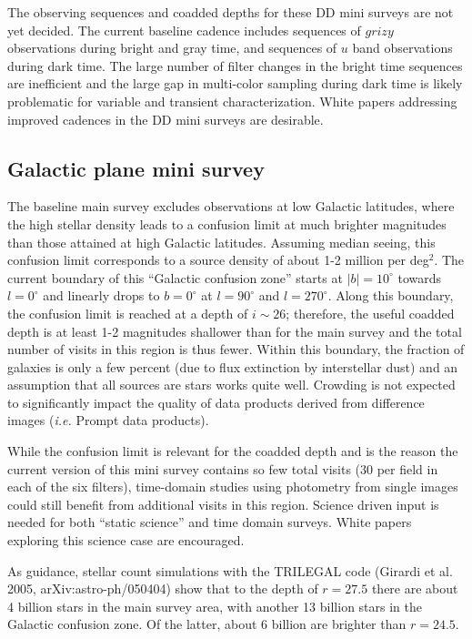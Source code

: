 \documentclass[DM,toc,usenatbib]{lsstdoc}
\begin{document}
The observing sequences and coadded depths for these DD mini surveys are not yet decided. The current baseline
cadence includes sequences of $grizy$ observations during bright and gray time, and sequences of $u$ 
band observations during dark time. The large number of filter changes in the bright time sequences
are inefficient and the large gap in multi-color sampling during dark time is likely problematic 
for variable and transient characterization. White papers addressing improved cadences 
in the DD mini surveys are desirable.


\subsection{Galactic plane mini survey \label{sec:GP}}

The baseline main survey excludes observations at low Galactic latitudes, where the high 
stellar density leads to a confusion limit at much brighter magnitudes than those attained 
at high Galactic latitudes. Assuming median seeing, this confusion limit corresponds to a
source density of about 1-2 million per deg$^2$. The current boundary of this ``Galactic
confusion zone'' starts at $|b|=10^\circ$ towards $l=0^\circ$ and linearly drops to $b=0^\circ$
at $l=90^\circ$ and $l=270^\circ$. Along this boundary, the confusion limit is reached at a
depth of $i \sim 26$; therefore, the useful coadded depth is at least 1-2 magnitudes 
shallower than for the main survey and the total number of visits in this region is thus fewer. 
Within this boundary, the fraction of galaxies is only a few percent (due to flux extinction 
by interstellar dust) and an assumption that all sources are stars works quite well. 
Crowding is not expected to significantly impact the quality of data products derived from difference images
({\it i.e.} Prompt data products). 

While the confusion limit is relevant for the coadded depth and is the reason the current version of this mini survey
contains so few total visits (30 per field in each of the six filters), time-domain studies using photometry from 
single images could still benefit from additional visits in this region. Science driven input is needed for both ``static science'' 
and time domain surveys. White papers exploring this science case are encouraged.

As guidance, stellar count simulations with the TRILEGAL code (Girardi et al. 2005, 
arXiv:astro-ph/050404) show that to the depth of $r=27.5$ there are about 4 billion
stars in the main survey area, with another 13 billion stars in the Galactic confusion 
zone. Of the latter, about 6 billion are brighter than $r=24.5$.  
\end{document}
